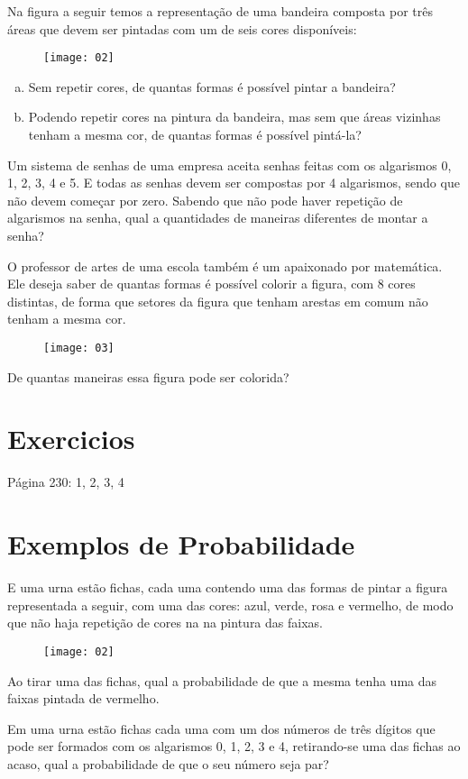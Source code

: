 \documentclass[twocolumn,oneside,a4paper,12pt]{article}
\begin{document}
\begin{exemplo}
Na figura a seguir temos a representação de uma bandeira composta por três áreas que devem ser pintadas com um de seis cores disponíveis:
	
	\begin{figure}[!tbh]
	\center
	\texttt{[image: 02]}
	\end{figure}
\end{exemplo}

\begin{enumerate}[(a)]
\item Sem repetir cores, de quantas formas é possível pintar a bandeira?
\item Podendo repetir cores na pintura da bandeira, mas sem que áreas vizinhas tenham a mesma cor, de quantas formas é possível pintá-la?
\end{enumerate}

\begin{exemplo}
Um sistema de senhas de uma empresa aceita senhas feitas com os algarismos 0, 1, 2, 3, 4 e 5. E todas as senhas devem ser compostas por 4 algarismos, sendo que não devem começar por zero. Sabendo que não pode haver repetição de algarismos na senha, qual a quantidades de maneiras diferentes de montar a senha?
\end{exemplo}

\begin{exemplo}
O professor de artes de uma escola também é um apaixonado por matemática. Ele deseja saber de quantas formas é possível colorir a figura, com 8 cores distintas, de forma que setores da figura que tenham arestas em comum não tenham a mesma cor.
	
	\begin{figure}[!tbh]
	\center
	\texttt{[image: 03]}
	\end{figure}

\noindent De quantas maneiras essa figura pode ser colorida?
\end{exemplo}

\section{Exercicios}

 Página 230: 1, 2, 3, 4

\section{Exemplos de Probabilidade}
\begin{exemplo}
E uma urna estão fichas, cada uma contendo uma das formas de pintar a figura representada a seguir, com uma das cores: azul, verde, rosa e vermelho, de modo que não haja repetição de cores na na pintura das faixas.
	
	\begin{figure}[!tbh]
	\center
	\texttt{[image: 02]}
	\end{figure}

\noindent Ao tirar uma das fichas, qual a probabilidade de que a mesma tenha uma das faixas pintada de vermelho.
\end{exemplo}


\begin{exemplo}
Em uma urna estão fichas cada uma com um dos números de três dígitos que pode ser formados com os algarismos 0, 1, 2, 3 e 4, retirando-se uma das fichas ao acaso, qual a probabilidade de que o seu número seja par?
\end{exemplo}
\end{document}

